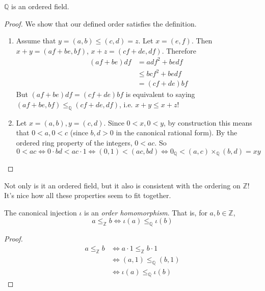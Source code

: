     \begin{theorem}
      $\mathbb{Q}$ is an ordered field. 
    \end{theorem} 
    \begin{proof}
      We show that our defined order satisfies the definition. 
      \begin{enumerate}
        \item Assume that $y = (a, b) \leq (c, d) = z$. Let $x = (e, f)$. Then $x + y = (af + be, bf)$, $x + z = (cf + de, df)$. Therefore 
        \begin{align}
          (af + be) df & = adf^2 + bedf \\ 
                       & \leq bcf^2 + bedf \\
                       & = (cf + de) bf
        \end{align} 
        But $(af + be) df = (cf + de) bf$ is equivalent to saying $(af + be, bf) \leq_{\mathbb{Q}} (cf + de, df)$, i.e. $x + y \leq x + z$!  

        \item Let $x = (a, b), y = (c, d)$. Since $0 < x, 0 < y$, by construction this means that $0 < a, 0 < c$ (since $b, d > 0$ in the canonical rational form). By the ordered ring property of the integers, $0 < ac$. So 
        \begin{equation}
          0 < ac \iff 0 \cdot bd < ac \cdot 1 \iff (0, 1) < (ac, bd)  \iff 0_{\mathbb{Q}} < (a, c) \times_{\mathbb{Q}} (b, d) = x y
        \end{equation}
      \end{enumerate}
    \end{proof} 

    Not only is it an ordered field, but it also is consistent with the ordering on $\mathbb{Z}$! It's nice how all these properties seem to fit together. 

    \begin{theorem}
      The canonical injection $\iota$ is an \textit{order homomorphism}. That is, for $a, b \in \mathbb{Z}$, 
      \begin{equation}
        a \leq_{\mathbb{Z}} b \iff \iota(a) \leq_{\mathbb{Q}} \iota(b)
      \end{equation}
    \end{theorem}
    \begin{proof} 
      \begin{align}
        a \leq_{\mathbb{Z}} b & \iff a \cdot 1 \leq_{\mathbb{Z}} b \cdot 1 \\
                              & \iff (a, 1) \leq_{\mathbb{Q}} (b, 1) \\
                              & \iff \iota(a) \leq_{\mathbb{Q}} \iota(b)
      \end{align}
    \end{proof}

